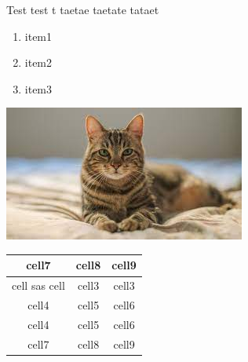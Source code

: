 \documentclass{report}
\begin{document}
    Test test t
    taetae 
    taetate \newline
    tataet

    \begin{enumerate}
        \item item1
        \item item2
        \item item3
    \end{enumerate}

    \includegraphics{../cat.jpg}

    \begin{tabular}{| c | c | c |}
        \hline
        \hline
        cell7 & cell8 & cell9\\
        \hline
        cell sas cell & cell3 & cell3 \\
        cell4 & cell5 & cell6 \\
        cell4 & cell5 & cell6 \\
        cell7 & cell8 & cell9  
   \end{tabular}
\end{document}
